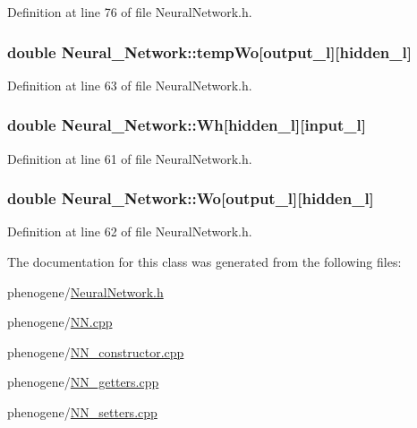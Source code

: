 Definition at line 76 of file Neural\-Network.\-h.

\hypertarget{a00003_a1cca3513af05c6dce603fdf332b36691}{
\subsubsection[{temp\-Wo}]{\setlength{\rightskip}{0pt plus 5cm}double Neural\-\_\-\-Network\-::temp\-Wo\mbox{[}{\bf output\-\_\-l}\mbox{]}\mbox{[}{\bf hidden\-\_\-l}\mbox{]}\hspace{0.3cm}{\ttfamily [private]}}}\label{d1/d7c/a00003_a1cca3513af05c6dce603fdf332b36691}


Definition at line 63 of file Neural\-Network.\-h.

\hypertarget{a00003_a45dfc138d645e05eaeaa6ca6bb3df818}{
\subsubsection[{Wh}]{\setlength{\rightskip}{0pt plus 5cm}double Neural\-\_\-\-Network\-::\-Wh\mbox{[}{\bf hidden\-\_\-l}\mbox{]}\mbox{[}{\bf input\-\_\-l}\mbox{]}\hspace{0.3cm}{\ttfamily [private]}}}\label{d1/d7c/a00003_a45dfc138d645e05eaeaa6ca6bb3df818}


Definition at line 61 of file Neural\-Network.\-h.

\hypertarget{a00003_ad6730ce7c9fc3937299dd32473b12d1d}{
\subsubsection[{Wo}]{\setlength{\rightskip}{0pt plus 5cm}double Neural\-\_\-\-Network\-::\-Wo\mbox{[}{\bf output\-\_\-l}\mbox{]}\mbox{[}{\bf hidden\-\_\-l}\mbox{]}\hspace{0.3cm}{\ttfamily [private]}}}\label{d1/d7c/a00003_ad6730ce7c9fc3937299dd32473b12d1d}


Definition at line 62 of file Neural\-Network.\-h.



The documentation for this class was generated from the following files\-:\begin{DoxyCompactItemize}
\item 
phenogene/\hyperlink{a00014}{Neural\-Network.\-h}\item 
phenogene/\hyperlink{a00015}{N\-N.\-cpp}\item 
phenogene/\hyperlink{a00016}{N\-N\-\_\-constructor.\-cpp}\item 
phenogene/\hyperlink{a00017}{N\-N\-\_\-getters.\-cpp}\item 
phenogene/\hyperlink{a00018}{N\-N\-\_\-setters.\-cpp}\end{DoxyCompactItemize}

